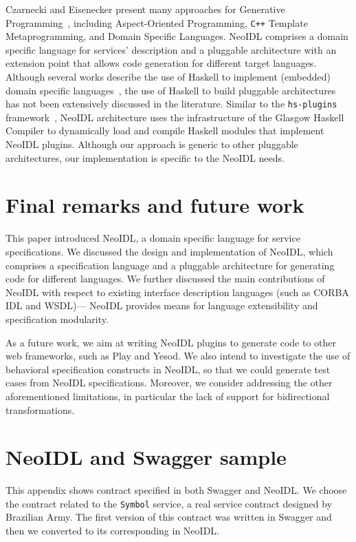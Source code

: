 \documentclass{ws-ijseke}
\newcommand{\neoidl}{NeoIDL}
\begin{document}
Czarnecki and Eisenecker present many approaches for Generative 
Programming~\cite{czarnecki-book}, including Aspect-Oriented Programming,
\texttt{C++} Template Metaprogramming, and Domain Specific
Languages. \neoidl{} comprises a domain specific language
for services' description and a pluggable architecture with an 
extension point that allows code generation for different target
languages. Although several works describe the use of Haskell to implement
(embedded) domain specific languages~\cite{hudak-dsl1}, the use of Haskell
to build pluggable architectures has not been extensively discussed 
in the literature. Similar to the \texttt{hs-plugins}
framework~\cite{pang:2004}, \neoidl{} architecture uses the infrastructure of
the Glasgow Haskell Compiler to dynamically load and compile Haskell
modules that implement \neoidl{} plugins. 
Although our approach is 
generic to other pluggable architectures, our  implementation is
specific to the \neoidl{} needs.  

\section{Final remarks and future work}\label{sec:conclusions}

This paper introduced \neoidl{}, a domain specific language for
service specifications. We discussed 
the design and implementation of \neoidl{}, which 
comprises a specification language and a pluggable
architecture for generating code for different languages. We further 
discussed the main contributions of \neoidl{} with respect to existing
interface description
languages (such as CORBA IDL and WSDL)--- \neoidl{} provides means for  
language extensibility and specification modularity.

As a future work, we aim at writing 
\neoidl{} plugins to generate code to other web frameworks, such as Play
and Yesod. We also intend to investigate the use of
behavioral specification constructs in \neoidl{}, so that we could 
generate test cases from \neoidl{} specifications.
Moreover, we consider addressing the other aforementioned limitations, in
particular the lack of support for bidirectional transformations.


\appendix

\section {\neoidl{} and Swagger sample}  

This appendix shows contract specified in
both Swagger and \neoidl{}. We choose the contract related to 
the \texttt{Symbol} service, a real
service contract designed by Brazilian Army. The first version of
this contract was written in Swagger and then we converted to 
its corresponding in \neoidl{}.
\end{document}
